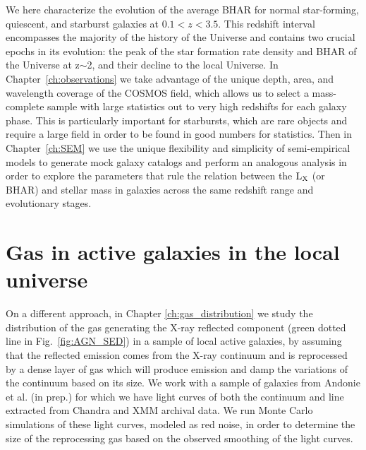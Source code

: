         We here characterize the evolution of the average BHAR for normal star-forming, quiescent, and starburst galaxies at $0.1<z<3.5$. This redshift interval encompasses the majority of the history of the Universe and contains two crucial epochs in its evolution: the peak of the star formation rate density and BHAR of the Universe at z$\sim$2, and their decline to the local Universe. In Chapter~\ref{ch:observations} 
        we take advantage of the unique depth, area, and wavelength coverage of the COSMOS field, which allows us to select a mass-complete sample with large statistics out to very high redshifts for each galaxy phase. This is particularly important for starbursts, which are rare objects and require a large field in order to be found in good numbers for statistics.
        Then in Chapter~\ref{ch:SEM} we use the unique flexibility and simplicity of semi-empirical models to generate mock galaxy catalogs and perform an analogous analysis in order to explore the parameters that rule the relation between the ${\rm L}_{\rm X}$ (or BHAR) and stellar mass in galaxies across the same redshift range and evolutionary stages.
        
        \section{Gas in active galaxies in the local universe}
        On a different approach, in Chapter \ref{ch:gas_distribution} we study the distribution of the gas generating the X-ray reflected component (green dotted line in Fig.~\ref{fig:AGN_SED}) in a sample of local active galaxies, by assuming that the reflected emission comes from the X-ray continuum and is reprocessed by a dense layer of gas which will produce \kalfa{} emission and damp the variations of the continuum based on its size. We work with a sample of galaxies from Andonie et al. (in prep.) for which we have light curves of both the continuum and \kalfa{} line extracted from Chandra and XMM archival data. We run Monte Carlo simulations of these light curves, modeled as red noise, in order to determine the size of the reprocessing gas based on the observed smoothing of the \kalfa{} light curves.
